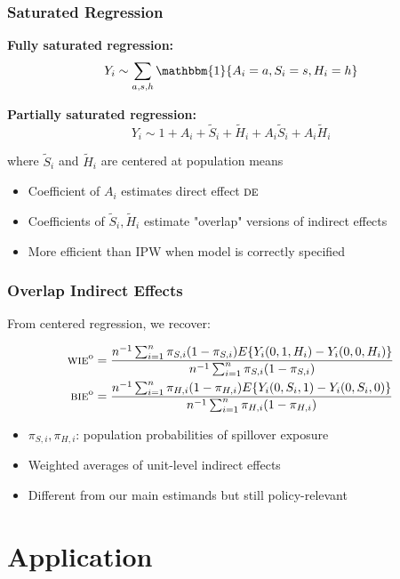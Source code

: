 \documentclass{beamer}
\newcommand{\indicator}{\mathbbm{1}}
\newcommand{\de}{\textsc{de}}
\newcommand{\bie}{\textsc{bie}}
\newcommand{\wie}{\textsc{wie}}
\newcommand{\sumi}{\sum_{i=1}^n}
\begin{document}
\begin{frame}
\frametitle{Saturated Regression}
\textbf{Fully saturated regression:}
$$Y_i \sim \sum_{a,s,h} \indicator\{A_i=a, S_i=s, H_i=h\}$$

\vspace{0.5cm}
\textbf{Partially saturated regression:}
$$Y_i \sim 1 + A_i + \tilde{S}_i + \tilde{H}_i + A_i\tilde{S}_i + A_i\tilde{H}_i$$

where $\tilde{S}_i$ and $\tilde{H}_i$ are centered at population means

\vspace{0.5cm}
\begin{itemize}
\item Coefficient of $A_i$ estimates direct effect $\de$
\item Coefficients of $\tilde{S}_i, \tilde{H}_i$ estimate "overlap" versions of indirect effects
\item More efficient than IPW when model is correctly specified
\end{itemize}
\end{frame}

\begin{frame}
\frametitle{Overlap Indirect Effects}
From centered regression, we recover:

\begin{align}
\wie^{\text{o}} &= \frac{n^{-1}\sumi \pi_{S,i}(1-\pi_{S,i})E\{Y_i(0,1,H_i)-Y_i(0,0,H_i)\}}{n^{-1}\sumi \pi_{S,i}(1-\pi_{S,i})} \\
\bie^{\text{o}} &= \frac{n^{-1}\sumi \pi_{H,i}(1-\pi_{H,i})E\{Y_i(0,S_i,1)-Y_i(0,S_i,0)\}}{n^{-1}\sumi \pi_{H,i}(1-\pi_{H,i})}
\end{align}

\vspace{0.5cm}
\begin{itemize}
\item $\pi_{S,i}, \pi_{H,i}$: population probabilities of spillover exposure
\item Weighted averages of unit-level indirect effects
\item Different from our main estimands but still policy-relevant
\end{itemize}
\end{frame}

\section{Application}
\end{document}
